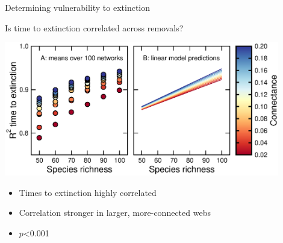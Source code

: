 \documentclass{beamer}
\newcommand*\whitem{%
  \item[\color{white}\scalebox{0.9}{\textbullet}]}
\begin{document}



  \begin{frame}{Determining vulnerability to extinction}

    \begin{block}{Is time to extinction correlated across removals?}

    \vspace{0.2cm}

    \begin{centering}
    
      \includegraphics[width=0.9\textwidth]{../manuscript/figures/extinction_order/extorder_correlations_talk_full.eps}
    
      \end{centering}

    \end{block}

    \begin{itemize}
      \item Times to extinction highly correlated
      \whitem {\color{white}Correlation stronger in larger, more-connected webs}
      \whitem {\color{white}$p$\textless0.001}
    \end{itemize}

    \end{frame}
\end{document}
